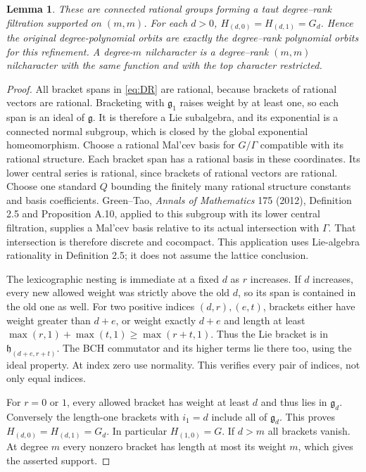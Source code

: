 \documentclass[11pt]{article}
\newtheorem{lemma}{Lemma}\newtheorem{theorem}[lemma]{Theorem}
\begin{document}
\begin{lemma}\label{lem:DR}
These are connected rational groups forming a taut degree--rank
filtration supported on $(m,m)$. For each $d>0$,
$H_{(d,0)}=H_{(d,1)}=G_d$. Hence the original degree-polynomial orbits
are exactly the degree--rank polynomial orbits for this refinement.
A degree-$m$ nilcharacter is a degree--rank $(m,m)$ nilcharacter
with the same function and with the top character restricted.
\end{lemma}
\begin{proof}
All bracket spans in \eqref{eq:DR} are rational, because brackets of
rational vectors are rational. Bracketing with $\mathfrak g_1$ raises
weight by at least one, so each span is an ideal of $\mathfrak g$.
It is therefore a Lie subalgebra, and its exponential is a connected
normal subgroup, which is closed by the global exponential homeomorphism.
Choose a rational Mal'cev basis for $G/\Gamma$ compatible with its rational
structure. Each bracket span has a rational basis in these coordinates.
Its lower central series is rational, since brackets of rational vectors
are rational. Choose one standard $Q$ bounding the finitely many rational
structure constants and basis coefficients. Green--Tao, \emph{Annals of
Mathematics} 175 (2012), Definition 2.5 and Proposition A.10, applied to
this subgroup with its lower central filtration, supplies a Mal'cev basis
relative to its actual intersection with $\Gamma$. That intersection is
therefore discrete and cocompact. This application uses Lie-algebra
rationality in Definition 2.5; it does not assume the lattice conclusion.

The lexicographic nesting is immediate at a fixed $d$ as $r$ increases.
If $d$ increases, every new allowed weight was strictly above the old
$d$, so its span is contained in the old one as well. For two positive
indices $(d,r),(e,t)$, brackets either have weight greater than $d+e$,
or weight exactly $d+e$ and length at least
$\max(r,1)+\max(t,1)\geq\max(r+t,1)$. Thus the Lie bracket is in
$\mathfrak h_{(d+e,r+t)}$. The BCH commutator and its higher terms
lie there too, using the ideal property. At index zero use normality.
This verifies every pair of indices, not only equal indices.

For $r=0$ or $1$, every allowed bracket has weight at least $d$ and
thus lies in $\mathfrak g_d$. Conversely the length-one brackets with
$i_1=d$ include all of $\mathfrak g_d$. This proves
$H_{(d,0)}=H_{(d,1)}=G_d$. In particular $H_{(1,0)}=G$.
If $d>m$ all brackets vanish. At degree $m$ every nonzero bracket has
length at most its weight $m$, which gives the asserted support.


\end{proof}
\end{document}
